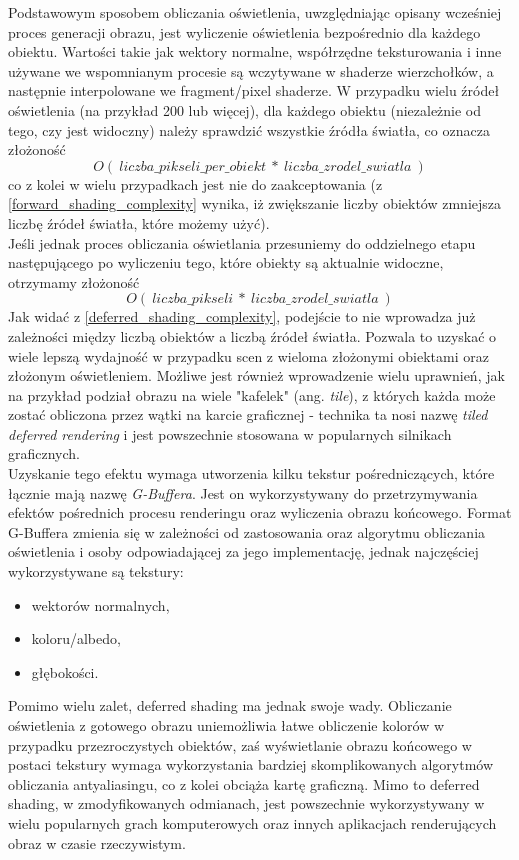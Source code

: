 Podstawowym sposobem obliczania oświetlenia, uwzględniając opisany wcześniej proces generacji obrazu, jest wyliczenie oświetlenia bezpośrednio dla każdego obiektu. Wartości takie jak wektory normalne, współrzędne teksturowania i inne używane we wspomnianym procesie są wczytywane w shaderze wierzchołków, a następnie interpolowane we fragment/pixel shaderze. W przypadku wielu źródeł oświetlenia (na przykład 200 lub więcej), dla każdego obiektu (niezależnie od tego, czy jest widoczny) należy sprawdzić wszystkie źródła światła, co oznacza złożoność
\begin{equation}
\label{forward_shading_complexity}
O(~liczba\_pikseli\_per\_obiekt~*~liczba\_zrodel\_swiatla~)
\end{equation}
co z kolei w wielu przypadkach jest nie do zaakceptowania (z \ref{forward_shading_complexity} wynika, iż zwiększanie liczby obiektów zmniejsza liczbę źródeł światła, które możemy użyć).\\
Jeśli jednak proces obliczania oświetlania przesuniemy do oddzielnego etapu następującego po wyliczeniu tego, które obiekty są aktualnie widoczne, otrzymamy złożoność
\begin{equation}
\label{deferred_shading_complexity}
O(~liczba\_pikseli~*~liczba\_zrodel\_swiatla~)
\end{equation}
Jak widać z \ref{deferred_shading_complexity}, podejście to nie wprowadza już zależności między liczbą obiektów a liczbą źródeł światła. Pozwala to uzyskać o wiele lepszą wydajność w przypadku scen z wieloma złożonymi obiektami oraz złożonym oświetleniem. Możliwe jest również wprowadzenie wielu uprawnień, jak na przykład podział obrazu na wiele "kafelek" (ang. \emph{tile}), z których każda może zostać obliczona przez wątki na karcie graficznej - technika ta nosi nazwę \emph{tiled deferred rendering} i jest powszechnie stosowana w popularnych silnikach graficznych.\\
Uzyskanie tego efektu wymaga utworzenia kilku tekstur pośredniczących, które łącznie mają nazwę \emph{G-Buffera}. Jest on wykorzystywany do przetrzymywania efektów pośrednich procesu renderingu oraz wyliczenia obrazu końcowego. Format G-Buffera zmienia się w zależności od zastosowania oraz algorytmu obliczania oświetlenia i osoby odpowiadającej za jego implementację, jednak najczęściej wykorzystywane są tekstury:
\begin{itemize}
\item wektorów normalnych,
\item koloru/albedo,
\item głębokości.
\end{itemize}
Pomimo wielu zalet, deferred shading ma jednak swoje wady. Obliczanie oświetlenia z gotowego obrazu uniemożliwia łatwe obliczenie kolorów w przypadku przezroczystych obiektów, zaś wyświetlanie obrazu końcowego w postaci tekstury wymaga wykorzystania bardziej skomplikowanych algorytmów obliczania antyaliasingu, co z kolei obciąża kartę graficzną. Mimo to deferred shading, w zmodyfikowanych odmianach, jest powszechnie wykorzystywany w wielu popularnych grach komputerowych oraz innych aplikacjach renderujących obraz w czasie rzeczywistym.

